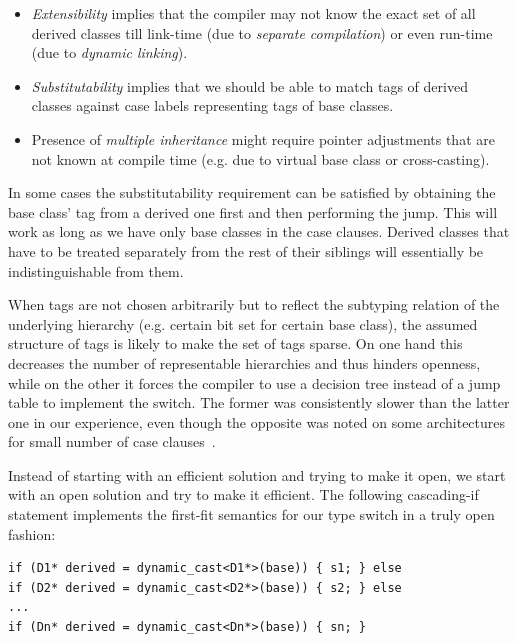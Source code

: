 \begin{itemize}
\setlength{\itemsep}{0pt}
\setlength{\parskip}{0pt}
\item \emph{Extensibility} implies that the compiler may not know the exact set 
      of all derived classes till link-time (due to \emph{separate compilation}) 
      or even run-time (due to \emph{dynamic linking}).
\item \emph{Substitutability} implies that we should be able to 
      match tags of derived classes against case labels representing tags of 
      base classes.
\item Presence of \emph{multiple inheritance} might require pointer adjustments 
      that are not known at compile time (e.g. due to virtual base class or 
      cross-casting).
\end{itemize}

\noindent
In some cases the substitutability requirement can be satisfied by obtaining 
the base class' tag from a derived one first and then performing the jump. 
This will work as long as we have only base classes in the case clauses.
Derived classes that have to be treated separately from the rest of their 
siblings will essentially be indistinguishable from them.

When tags are not chosen arbitrarily but to reflect the subtyping relation of the 
underlying hierarchy (e.g. certain bit set for certain base class), the assumed 
structure of tags is likely to make the set of tags sparse. On one hand this 
decreases the number of representable hierarchies and thus hinders openness, 
while on the other it forces the compiler to use a decision tree instead of a jump 
table to implement the switch. The former was consistently slower than the 
latter one in our experience, even though the opposite was noted on some 
architectures for small number of case clauses~\cite[]{garrigue-98}.

Instead of starting with an efficient solution and trying to make it open, we 
start with an open solution and try to make it efficient. The following 
cascading-if statement implements the first-fit semantics for our type switch in 
a truly open fashion:

\begin{lstlisting}
if (D1* derived = dynamic_cast<D1*>(base)) { s1; } else
if (D2* derived = dynamic_cast<D2*>(base)) { s2; } else
...
if (Dn* derived = dynamic_cast<Dn*>(base)) { sn; }
\end{lstlisting}

